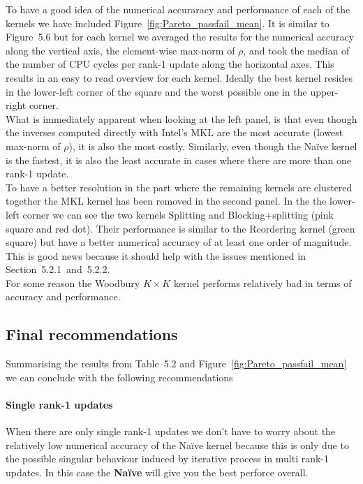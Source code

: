 \documentclass[11pt]{article}
\numberwithin{figure}{section}
\numberwithin{table}{section}
\begin{document}
    To have a good idea of the numerical accuraracy and performance of each of the kernels we have included Figure~\ref{fig:Pareto_passfail_mean}. It is similar to Figure~5.6 but for each kernel we averaged the results for the numerical accuracy along the vertical axis, the element-wise max-norm of $\rho$, and took the median of the number of CPU cycles per rank-1 update along the horizontal axes. This results in an easy to read overview for each kernel. Ideally the best kernel resides in the lower-left corner of the square and the worst possible one in the upper-right corner.\\
    
    What is immediately apparent when looking at the left panel, is that even though the inverses computed directly with Intel's MKL are the most accurate (lowest max-norm of $\rho$), it is also the most costly. Similarly, even though the Na\"{i}ve kernel is the fastest, it is also the least accurate in cases where there are more than one rank-1 update.\\
    
    To have a better resolution in the part where the remaining kernels are clustered together the MKL kernel has been removed in the second panel. In the the lower-left corner we can see the two kernels Splitting and Blocking+splitting (pink square and red dot). Their performance is similar to the Reordering kernel (green square) but have a better numerical accuracy of at least one order of magnitude. This is good news because it should help with the issues mentioned in Section~5.2.1~and~5.2.2.\\
    
    For some reason the Woodbury $K\times K$ kernel performs relatively bad in terms of accuracy and performance.
    
    \subsection{Final recommendations}
      Summarising the results from Table~5.2 and Figure~\ref{fig:Pareto_passfail_mean} we can conclude with the following recommendations
      
    \paragraph{Single rank-1 updates} When there are only single rank-1 updates we don't have to worry about the relatively low numerical accuracy of the Na\"{i}ve kernel because this is only due to the possible singular behaviour induced by iterative process in multi rank-1 updates. In this case the \textbf{Na\"{i}ve} will give you the best perforce overall.
    
\end{document}
